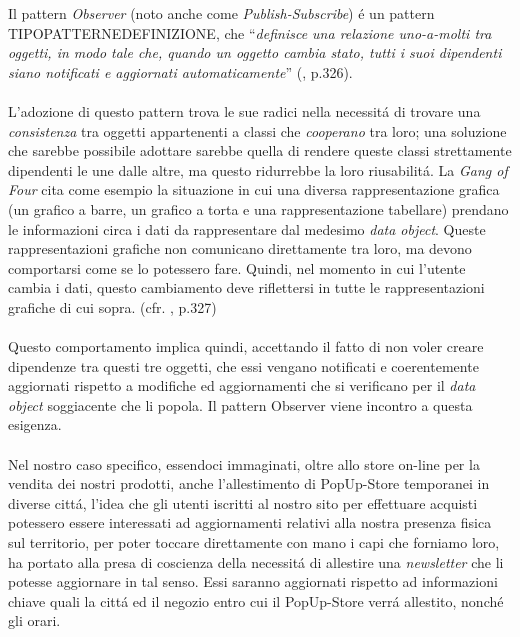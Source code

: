 \documentclass[12pt]{article}
\begin{document}
Il pattern \textit{Observer} (noto anche come \textit{Publish-Subscribe}) \'e un pattern TIPOPATTERNEDEFINIZIONE, che ``\textit{definisce una relazione uno-a-molti tra oggetti, in modo tale che, quando un oggetto cambia stato, tutti i suoi dipendenti siano notificati e aggiornati automaticamente}'' (\cite{gof_riferimento}, p.326). 
\\
\\
L'adozione di questo pattern trova le sue radici nella necessit\'a di trovare una \textit{consistenza} tra oggetti appartenenti a classi che \textit{cooperano} tra loro; una soluzione che sarebbe possibile adottare sarebbe quella di rendere queste classi strettamente dipendenti le une dalle altre, ma questo ridurrebbe la loro riusabilit\'a. La \textit{Gang of Four} cita come esempio la situazione in cui una diversa rappresentazione grafica (un grafico a barre, un grafico a torta e una rappresentazione tabellare) prendano le informazioni circa i dati da rappresentare dal medesimo \textit{data object}. Queste rappresentazioni grafiche non comunicano direttamente tra loro, ma devono comportarsi come se lo potessero fare. Quindi, nel momento in cui l'utente cambia i dati, questo cambiamento deve riflettersi in tutte le rappresentazioni grafiche di cui sopra. (cfr. \cite{gof_riferimento}, p.327)
\\
\\
Questo comportamento implica quindi, accettando il fatto di non voler creare dipendenze tra questi tre oggetti, che essi vengano notificati e coerentemente aggiornati rispetto a modifiche ed aggiornamenti che si verificano per il \textit{data object} soggiacente che li popola. Il pattern Observer viene incontro a questa esigenza. 
\\
\\
Nel nostro caso specifico, essendoci immaginati, oltre allo store on-line per la vendita dei nostri prodotti, anche l'allestimento di PopUp-Store temporanei in diverse citt\'a, l'idea che gli utenti iscritti al nostro sito per effettuare acquisti potessero essere interessati ad aggiornamenti relativi alla nostra presenza fisica sul territorio, per poter toccare direttamente con mano i capi che forniamo loro, ha portato alla presa di coscienza della necessit\'a di allestire una \textit{newsletter} che li potesse aggiornare in tal senso. Essi saranno aggiornati rispetto ad informazioni chiave quali la citt\'a ed il negozio entro cui il PopUp-Store verr\'a allestito, nonch\'e gli orari. 
\\
\\
\end{document}
